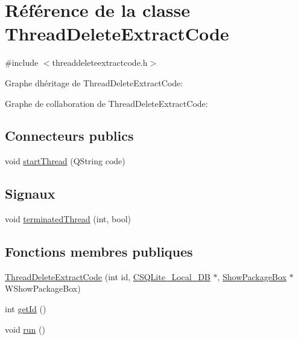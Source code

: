 \hypertarget{class_thread_delete_extract_code}{}\section{Référence de la classe Thread\+Delete\+Extract\+Code}
\label{class_thread_delete_extract_code}


{\ttfamily \#include $<$threaddeleteextractcode.\+h$>$}



Graphe d\textquotesingle{}héritage de Thread\+Delete\+Extract\+Code\+:


Graphe de collaboration de Thread\+Delete\+Extract\+Code\+:
\subsection*{Connecteurs publics}
\begin{DoxyCompactItemize}
\item 
void \hyperlink{class_thread_delete_extract_code_a793c867ce2acb8a55ad32f916b7b3bf4}{start\+Thread} (Q\+String code)
\end{DoxyCompactItemize}
\subsection*{Signaux}
\begin{DoxyCompactItemize}
\item 
void \hyperlink{class_thread_delete_extract_code_a293947d53210719856192a7f7d160173}{terminated\+Thread} (int, bool)
\end{DoxyCompactItemize}
\subsection*{Fonctions membres publiques}
\begin{DoxyCompactItemize}
\item 
\hyperlink{class_thread_delete_extract_code_af29c6eea6547341adfcd619dfd4d6e2e}{Thread\+Delete\+Extract\+Code} (int id, \hyperlink{class_c_s_q_lite___local___d_b}{C\+S\+Q\+Lite\+\_\+\+Local\+\_\+\+D\+B} $\ast$, \hyperlink{class_show_package_box}{Show\+Package\+Box} $\ast$W\+Show\+Package\+Box)
\item 
int \hyperlink{class_thread_delete_extract_code_a867dc1848a50060aa87855ed8c2f911c}{get\+Id} ()
\item 
void \hyperlink{class_thread_delete_extract_code_acd927e12bcf34fb36fdb881e635f0357}{run} ()
\end{DoxyCompactItemize}


